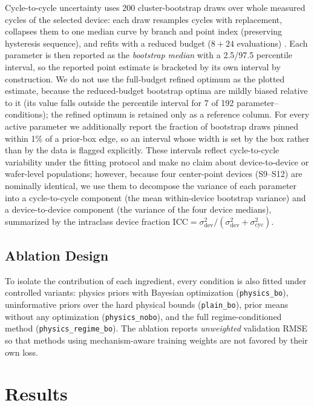 \documentclass[journal]{IEEEtran}
\begin{document}
Cycle-to-cycle uncertainty uses 200 cluster-bootstrap draws over whole
measured cycles of the selected device: each draw resamples cycles with
replacement, collapses them to one median curve by branch and point index
(preserving hysteresis sequence), and refits with a reduced budget ($8+24$
evaluations) \cite{efron1994bootstrap}.  Each parameter is then reported as the
\emph{bootstrap median} with a 2.5/97.5 percentile interval, so the reported
point estimate is bracketed by its own interval by construction.  We do not use
the full-budget refined optimum as the plotted estimate, because the
reduced-budget bootstrap optima are mildly biased relative to it (its value
falls outside the percentile interval for 7 of 192 parameter--conditions); the
refined optimum is retained only as a reference column.  For every active
parameter we additionally report the fraction of bootstrap draws pinned within
1\% of a prior-box edge, so an interval whose width is set by the box rather
than by the data is flagged explicitly.  These intervals reflect cycle-to-cycle
variability under the fitting protocol and make no claim about device-to-device
or wafer-level populations; however, because four center-point devices
(S9--S12) are nominally identical, we use them to decompose the variance of
each parameter into a cycle-to-cycle component (the mean within-device bootstrap
variance) and a device-to-device component (the variance of the four device
medians), summarized by the intraclass device fraction
$\mathrm{ICC}=\sigma^2_{\mathrm{dev}}/(\sigma^2_{\mathrm{dev}}+\sigma^2_{\mathrm{cyc}})$.

\subsection{Ablation Design}
\label{sec:ablation-design}

To isolate the contribution of each ingredient, every condition is also
fitted under controlled variants: physics priors with Bayesian optimization
(\texttt{physics\_bo}), uninformative priors over the hard physical bounds
(\texttt{plain\_bo}), prior means without any optimization
(\texttt{physics\_nobo}), and the full regime-conditioned method
(\texttt{physics\_regime\_bo}).  The ablation reports \emph{unweighted}
validation RMSE so that methods using mechanism-aware training weights are
not favored by their own loss.

\section{Results}
\label{sec:results}
\end{document}
